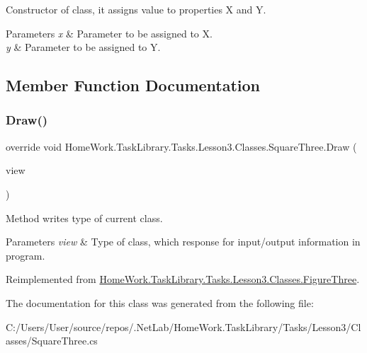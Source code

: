 Constructor of class, it assigns value to properties X and Y. 


\begin{DoxyParams}{Parameters}
{\em x} & Parameter to be assigned to X.\\
\hline
{\em y} & Parameter to be assigned to Y.\\
\hline
\end{DoxyParams}


\subsection{Member Function Documentation}
\mbox{\label{class_home_work_1_1_task_library_1_1_tasks_1_1_lesson3_1_1_classes_1_1_square_three_ab8713407ad8a5ba3f38785748aaa1847}} 
\subsubsection{\texorpdfstring{Draw()}{Draw()}}
{\footnotesize\ttfamily override void Home\+Work.\+Task\+Library.\+Tasks.\+Lesson3.\+Classes.\+Square\+Three.\+Draw (\begin{DoxyParamCaption}\item[{I\+Information}]{view }\end{DoxyParamCaption})\hspace{0.3cm}{\ttfamily [virtual]}}



Method writes type of current class. 


\begin{DoxyParams}{Parameters}
{\em view} & Type of class, which response for input/output information in program.\\
\hline
\end{DoxyParams}


Reimplemented from \mbox{\hyperlink{class_home_work_1_1_task_library_1_1_tasks_1_1_lesson3_1_1_classes_1_1_figure_three_a1dc44301b6143d7ec6e7089ed13d460e}{Home\+Work.\+Task\+Library.\+Tasks.\+Lesson3.\+Classes.\+Figure\+Three}}.



The documentation for this class was generated from the following file\+:\begin{DoxyCompactItemize}
\item 
C\+:/\+Users/\+User/source/repos/.\+Net\+Lab/\+Home\+Work.\+Task\+Library/\+Tasks/\+Lesson3/\+Classes/Square\+Three.\+cs\end{DoxyCompactItemize}
